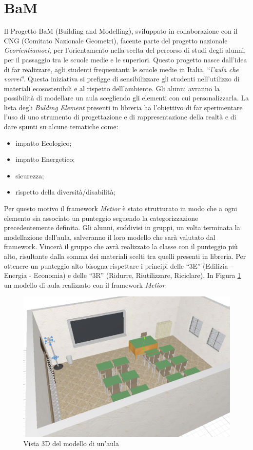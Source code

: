 \section{BaM}
\label{sec:chapter_4_section_1}
Il Progetto BaM (Building and Modelling), sviluppato in collaborazione con il CNG (Comitato Nazionale Geometri),
facente parte del progetto nazionale \emph{Georientiamoci}, per l’orientamento nella scelta
del percorso di studi degli alunni, per il passaggio tra le scuole medie e le superiori.
Questo progetto nasce dall'idea di far realizzare, agli studenti frequentanti le scuole medie in Italia,
``\emph{l'aula che vorrei}''. Questa iniziativa si prefigge di sensibilizzare gli studenti nell’utilizzo di materiali
ecosostenibili e al rispetto dell’ambiente.
Gli alunni avranno la possibilità di modellare un aula scegliendo gli elementi con cui personalizzarla.
La lista degli \emph{Bulding Element} presenti in libreria ha l’obiettivo di far sperimentare l’uso di uno strumento di progettazione
e di rappresentazione della realtà e di dare spunti su alcune tematiche come:
\begin{itemize}
\item impatto Ecologico;
\item impatto Energetico;
\item sicurezza;
\item rispetto della diversità/disabilità;
\end{itemize}
Per questo motivo il framework \emph{Metior} è stato strutturato in modo che a ogni elemento sia associato un punteggio seguendo
la categorizzazione precedentemente definita.
Gli alunni, suddivisi in gruppi, un volta terminata la modellazione dell'aula, salveranno il loro modello che sarà valutato
dal framework.
Vincerà il gruppo che avrà realizzato la classe con il punteggio più alto, risultante dalla somma dei materiali scelti
tra quelli presenti in libreria. Per ottenere un punteggio alto bisogna rispettare i principi delle
“3E” (Edilizia – Energia - Economia) e delle “3R” (Ridurre, Riutilizzare, Riciclare). In Figura \ref{fig:3daula}
un modello di aula realizzato con il framework \emph{Metior}.\\
\begin{figure}[htbp] %
   \centering
   \includegraphics[width=0.75\linewidth]{images/3d-school-2}
   \caption{Vista 3D del modello di un'aula}
   \label{fig:3daula}
   \end{figure}
\newpage

